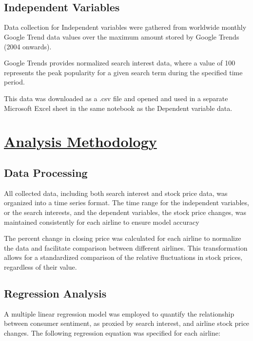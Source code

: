 \documentclass[12pt]{report}
\begin{document}
\\ \\
\subsection*{Independent Variables}
Data collection for Independent variables were gathered from worldwide monthly Google Trend data values over the maximum amount stored by Google Trends (2004 onwards).

Google Trends provides normalized search interest data, where a value of
100 represents the peak popularity for a given search term during the specified
time period.


This data was downloaded as a .csv file and opened and used in a separate Microsoft Excel sheet in the same notebook as the Dependent variable data.


\section*{\underline{Analysis Methodology}}
\subsection*{Data Processing}


All collected data, including both search interest and stock
price data, was organized into a time series format. The time range for the
independent variables, or the search interests, and the dependent variables,
the stock price changes, was maintained consistently for each airline to ensure
model accuracy

\par


The percent change in closing price was calculated for each airline
to normalize the data and facilitate comparison between different airlines.
This transformation allows for a standardized comparison of the relative
fluctuations in stock prices, regardless of their value.


\subsection*{Regression Analysis}


A multiple linear regression model was employed to quantify
the relationship between consumer sentiment, as proxied by search interest, and
airline stock price changes. The following regression equation was specified
for each airline:
\end{document}
